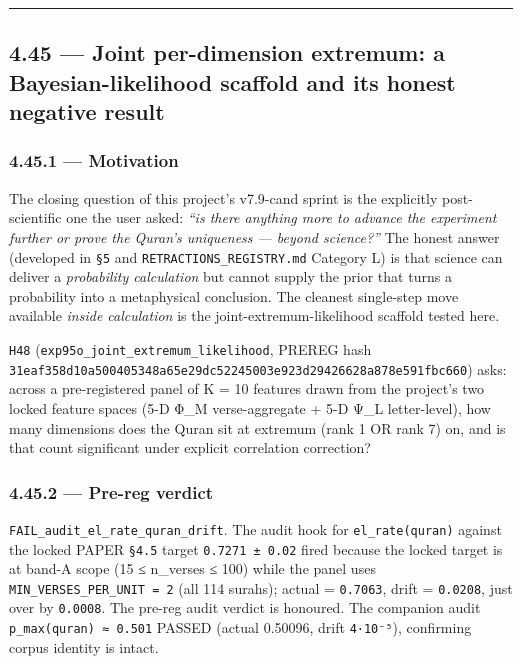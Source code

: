 \documentclass[
]{article}
\begin{document}
\begin{center}\rule{0.5\linewidth}{0.5pt}\end{center}

\subsection{4.45 --- Joint per-dimension extremum: a Bayesian-likelihood
scaffold and its honest negative
result}\label{joint-per-dimension-extremum-a-bayesian-likelihood-scaffold-and-its-honest-negative-result}

\subsubsection{4.45.1 --- Motivation}\label{motivation}

The closing question of this project's v7.9-cand sprint is the
explicitly post-scientific one the user asked: \emph{``is there anything
more to advance the experiment further or prove the Quran's uniqueness
--- beyond science?''} The honest answer (developed in \texttt{§5} and
\texttt{RETRACTIONS\_REGISTRY.md} Category L) is that science can
deliver a \emph{probability calculation} but cannot supply the prior
that turns a probability into a metaphysical conclusion. The cleanest
single-step move available \emph{inside calculation} is the
joint-extremum-likelihood scaffold tested here.

\texttt{H48} (\texttt{exp95o\_joint\_extremum\_likelihood}, PREREG hash
\texttt{31eaf358d10a500405348a65e29dc52245003e923d29426628a878e591fbc660})
asks: across a pre-registered panel of K = 10 features drawn from the
project's two locked feature spaces (5-D Φ\_M verse-aggregate + 5-D Ψ\_L
letter-level), how many dimensions does the Quran sit at extremum (rank
1 OR rank 7) on, and is that count significant under explicit
correlation correction?

\subsubsection{4.45.2 --- Pre-reg verdict}\label{pre-reg-verdict}

\texttt{FAIL\_audit\_el\_rate\_quran\_drift}. The audit hook for
\texttt{el\_rate(quran)} against the locked PAPER \texttt{§4.5} target
\texttt{0.7271\ ±\ 0.02} fired because the locked target is at band-A
scope (15 ≤ n\_verses ≤ 100) while the panel uses
\texttt{MIN\_VERSES\_PER\_UNIT\ =\ 2} (all 114 surahs); actual =
\texttt{0.7063}, drift = \texttt{0.0208}, just over by \texttt{0.0008}.
The pre-reg audit verdict is honoured. The companion audit
\texttt{p\_max(quran)\ ≈\ 0.501} PASSED (actual 0.50096, drift
\texttt{4·10⁻⁵}), confirming corpus identity is intact.
\end{document}
